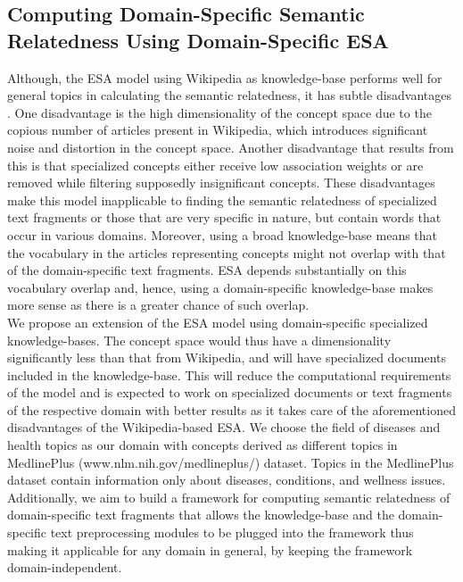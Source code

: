 \documentclass[journal,transmag]{IEEEtran}
\begin{document}
\subsection {\textbf{Computing Domain-Specific Semantic Relatedness Using Domain-Specific ESA}}

Although, the ESA model using Wikipedia as knowledge-base performs well for general topics in calculating the semantic relatedness, it has subtle disadvantages \cite{insights}. One disadvantage is the high dimensionality of the concept space due to the copious number of articles present in Wikipedia, which introduces significant noise and distortion in the concept space. Another disadvantage that results from this is that specialized concepts either receive low association weights or are removed while filtering supposedly insignificant concepts. These disadvantages make this model inapplicable to finding the semantic relatedness of specialized text fragments or those that are very specific in nature, but contain words that occur in various domains. Moreover, using a broad knowledge-base means that the vocabulary in the articles representing concepts might not overlap with that of the domain-specific text fragments. ESA depends substantially on this vocabulary overlap and, hence, using a domain-specific knowledge-base makes more sense as there is a greater chance of such overlap.\\
We propose an extension of the ESA model using domain-specific specialized knowledge-bases. The concept space would thus have a dimensionality significantly less than that from Wikipedia, and will have specialized documents included in the knowledge-base. This will reduce the computational requirements of the model and is expected to work on specialized documents or text fragments of the respective domain with better results as it takes care of the aforementioned disadvantages of the Wikipedia-based ESA.  We choose the field of diseases and health topics as our domain with concepts derived as different topics in MedlinePlus (www.nlm.nih.gov/medlineplus/‎) dataset. Topics in the MedlinePlus dataset contain information only about diseases, conditions, and wellness issues.\\
Additionally, we aim to build a framework for computing semantic relatedness of domain-specific text fragments that allows the knowledge-base and the domain-specific text preprocessing modules to be plugged into the framework thus making it applicable for any domain in general, by keeping the framework domain-independent.
\end{document}
